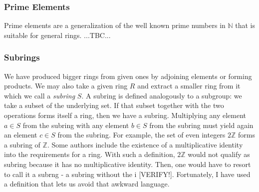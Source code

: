 \subsubsection{Prime Elements}
Prime elements are a generalization of the well known prime numbers in $\mathbb{N}$ that is suitable for general rings. ...TBC...




\subsubsection{Subrings}
We have produced bigger rings from given ones by adjoining elements or forming products. We may also take a given ring $R$ and extract a smaller ring from it which we call a \emph{subring} $S$. A subring is defined analogously to a subgroup: we take a subset of the underlying set. If that subset together with the two operations forms itself a ring, then we have a subring. Multiplying any element $a \in S$ from the subring with any element $b \in S$ from the subring must yield again an element $c \in S$ from the subring. For example, the set of even integers $2 \mathbb{Z}$ forms a subring of $\mathbb{Z}$. Some authors include the existence of a multiplicative identity into the requirements for a ring. With such a definition, $2 \mathbb{Z}$ would not qualify as subring because it has no multiplicative identity. Then, one would have to resort to call it a subrng - a subring without the i [VERIFY!]. Fortunately, I have used a definition that lets us avoid that awkward language.


